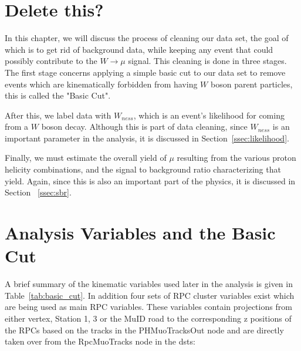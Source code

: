 \clearpage
\section{Delete this?}

In this chapter, we will discuss the process of cleaning our data set, the goal
of which is to get rid of background data, while keeping any event that could
possibly contribute to the $W\rightarrow\mu$ signal. This cleaning is done in
three stages. The first stage concerns applying a simple basic cut to our data
set to remove events which are kinematically forbidden from having $W$ boson
parent particles, this is called the "Basic Cut".

After this, we label data with $W_{ness}$, which is an event's likelihood for
coming from a $W$ boson decay. Although this is part of data cleaning, since
$W_{ness}$ is an important parameter in the analysis, it is discussed in
Section~\ref{ssec:likelihood}.

Finally, we must estimate the overall yield of $\mu$ resulting from the various
proton helicity combinations, and the signal to background ratio characterizing
that yield. Again, since this is also an important part of the physics, it is
discussed in Section ~\ref{ssec:sbr}.

\section{Analysis Variables and the Basic Cut}

A brief summary of the kinematic variables used later in the analysis is given
in Table~\ref{tab:basic_cut}. In addition four sets of RPC cluster variables exist
which are being used as main RPC variables. These variables contain
projections from either vertex, Station 1, 3 or the MuID road to the
corresponding z positions of the RPCs based on the tracks in the PHMuoTracksOut
node and are directly taken over from the RpcMuoTracks node in the dsts:

